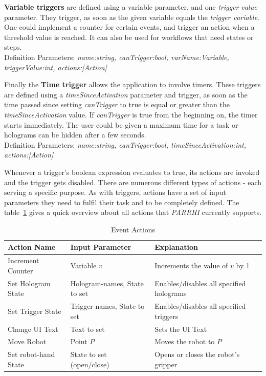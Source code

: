 \textbf{Variable triggers} are defined using a variable parameter, and one \textit{trigger value} parameter. They trigger, as soon as the given variable equals the \textit{trigger variable}. One could implement a counter for certain events, and trigger an action when a threshold value is reached. It can also be used for workflows that need states or steps. \\Definition Parameters: \textit{name:string, canTrigger:bool, varName:Variable, triggerValue:int, actions:[Action]}

Finally the \textbf{Time trigger} allows the application to involve timers. These triggers are defined using a \textit{timeSinceActivation} parameter and trigger, as soon as the time passed since setting \textit{canTrigger} to true is equal or greater than the \textit{timeSinceActivation} value. If \textit{canTrigger} is true from the beginning on, the timer starts immediately. The user could be given a maximum time for a task or holograms can be hidden after a few seconds.\\Definition Parameters: \textit{name:string, canTrigger:bool, timeSinceActivation:int, actions:[Action]}

Whenever a trigger's boolean expression evaluates to true, its actions are invoked and the trigger gets disabled. There are numerous different types of actions - each serving a specific purpose. As with triggers, actions have a set of input parameters they need to fulfil their task and to be completely defined. The table~\ref{Table:Actions} gives a quick overview about all actions that \textit{PARRHI} currently supports.

\begin{table}
	\caption{Event Actions}
	\label{Table:Actions}
	\centering
	\begin{tabular}{lll}
		\toprule
		Action Name & Input Parameter		& Explanation	\\		
		\midrule
		Increment Counter  	& Variable $v$					& Increments the value of $v$ by 1 \\
		Set Hologram State 	& Hologram-names, State to set	& Enables/disables all specified holograms \\
		Set Trigger State  	& Trigger-names, State to set  	& Enables/disables all specified triggers \\
		Change UI Text	  	& Text to set					& Sets the UI Text\\
		Move Robot			& Point $P$						& Moves the robot to $P$ \\
		Set robot-hand State & State to set (open/close)		& Opens or closes the robot's gripper \\
		\bottomrule
	\end{tabular}
\end{table}

